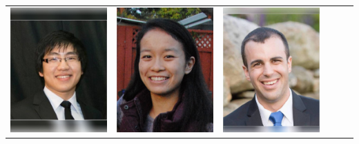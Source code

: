 \documentclass[landscape,a0paper,fontscale=0.292]{baposter}
\begin{document}
\begin{poster}
{\begin{center}
\begin{tabularx}{\linewidth}{X X X X X X}
{\centering \includegraphics[width=0.6\linewidth]{hanssusilo.jpg}}&
{\centering \includegraphics[width=0.6\linewidth]{jenshen.jpg}}&
{\centering \includegraphics[width=0.6\linewidth]{joe-wl.jpg}}&

\end{tabularx}
\end{center}}
\end{poster}
\end{document}
